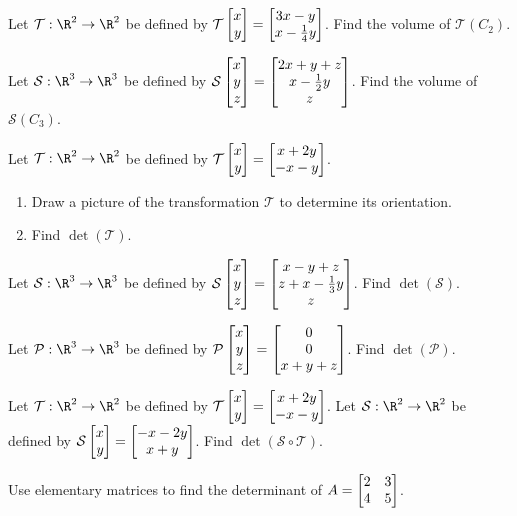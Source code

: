 \begin{exercises}
	\begin{problist}
		\prob Let $\mathcal T:\R^2\to\R^2$ be defined by $\mathcal T\mat{x\\y}=\matc{3x-y\\x-\tfrac{1}{4}y}$.
	Find the volume of $\mathcal T(C_2)$.
	
	    \prob Let $\mathcal S:\R^3\to\R^3$ be defined by $\mathcal S\mat{x\\y\\z}=\matc{2x+y+z\\x-\tfrac{1}{2}y\\z}$.
	Find the volume of $\mathcal S(C_3)$.
	    
	    \prob Let $\mathcal T:\R^2\to\R^2$ be defined by $\mathcal T\mat{x\\y}=\matc{x+2y\\-x-y}$.
	    \begin{enumerate}
			\item   Draw a picture of the transformation $\mathcal T$ to determine its orientation.
			\item  	Find $\det(\mathcal T)$.
        \end{enumerate}
        
        \prob Let $\mathcal S:\R^3\to\R^3$ be defined by $\mathcal S\mat{x\\y\\z}=\matc{x-y+z\\z+x-\tfrac{1}{3}y\\z}$.
        Find $\det(\mathcal S)$.
	    
        \prob Let $\mathcal P:\R^3\to\R^3$ be defined by $\mathcal P\mat{x\\y\\z}=\matc{0\\0\\x+y+z}$.
        Find $\det(\mathcal P)$.
        
        \prob Let $\mathcal T:\R^2\to\R^2$ be defined by $\mathcal T\mat{x\\y}=\matc{x+2y\\-x-y}$. Let $\mathcal S:\R^2\to\R^2$ be defined by $\mathcal S\mat{x\\y}=\matc{-x-2y\\x+y}$.
        Find $\det(\mathcal S\circ \mathcal T)$.
        
        \prob Use elementary matrices to find the determinant of $A=\mat{2&3\\4&5}$.
        

\end{problist}
\end{exercises}
